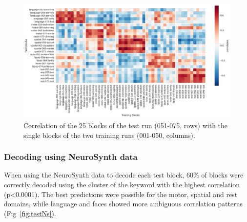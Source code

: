 \documentclass[fleqn,10pt]{SelfArx} %
\begin{document}
\begin{figure}[htbp]
	\begin{minipage}{\textwidth}
		\renewcommand{\familydefault}{\sfdefault}\normalfont
		\centering
		\includegraphics[width=\columnwidth]{./figs/fig8_blockWiseHeat.png}
				\vspace*{-3mm}
		\caption{Correlation of the 25 blocks of the test run (051-075, rows) with the single blocks of the two training runs (001-050, columns).}%
		\label{fig:testBlockHeat}
	\end{minipage}
\end{figure}

\subsubsection*{Decoding using NeuroSynth data}

When using the NeuroSynth data to decode each test block, 60\% of blocks were correctly decoded using the cluster of the keyword with the highest correlation (p<0.0001). The best predictions were possible for the motor, spatial and rest domains, while language and faces showed more ambiguous correlation patterns (Fig~\ref{fig:testNs}).
\end{document}
